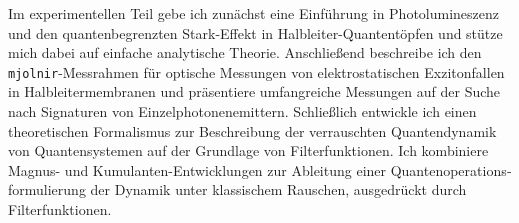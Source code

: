 \documentclass[a4paper,10pt]{article}
\begin{document}
\begin{german}
    Im experimentellen Teil gebe ich zunächst eine Einführung in Photolumineszenz und den quantenbegrenzten Stark-Effekt in Halbleiter-Quantentöpfen und stütze mich dabei auf einfache analytische Theorie.
    Anschließend beschreibe ich den \texttt{mjolnir}-Messrahmen für optische Messungen von elektrostatischen Exzitonfallen in Halbleitermembranen und präsentiere umfangreiche Messungen auf der Suche nach Signaturen von Einzelphotonenemittern.
    Schließlich entwickle ich einen theoretischen Formalismus zur Beschreibung der verrauschten Quantendynamik von Quantensystemen auf der Grundlage von Filterfunktionen.
    Ich kombiniere Magnus- und Kumulanten-Entwicklungen zur Ableitung einer Quantenoperationsformulierung der Dynamik unter klassischem Rauschen, ausgedrückt durch Filterfunktionen.
\end{german}
\end{document}
